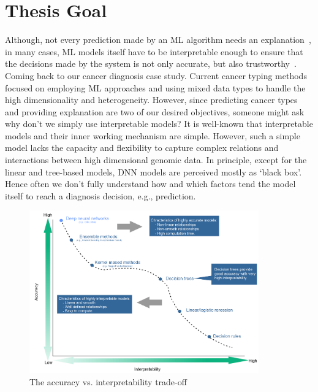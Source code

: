 \section{Thesis Goal} \label{thesis_goal}
Although, not every prediction made by an ML algorithm needs an explanation~\cite{stiglic2020interpretability}, in many cases, ML models itself have to be interpretable enough to ensure that the decisions made by the system is not only accurate, but also trustworthy~\cite{mehrabi2019survey}. 
Coming back to our cancer diagnosis case study. Current cancer typing methods focused on employing ML approaches and using mixed data types to handle the high dimensionality and heterogeneity. However, since predicting cancer types and providing explanation are two of our desired objectives, someone might ask why don't we simply use interpretable models? 
It is well-known that interpretable models and their inner working mechanism are simple. However, such a simple model lacks the capacity and flexibility to capture complex relations and interactions between high dimensional genomic data. In principle, except for the linear and tree-based models, DNN models are perceived mostly as `black box'. Hence often we don't fully understand how and which factors tend the model itself to reach a diagnosis decision, e.g., prediction. %

\begin{figure}[h]
	\centering
		\includegraphics[width=0.7\linewidth,height=70mm]{images/acc_vs_xai.png}
		\caption{The accuracy vs. interpretability trade-off}
        \label{fig:acc_vs_xai}
\end{figure}

